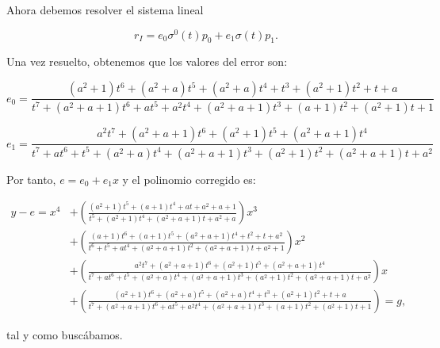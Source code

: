 \begin{ejemplo}
Ahora debemos resolver el sistema lineal 

$$r_I = e_0\sigma^0(t)p_0 + e_1\sigma(t)p_1.$$ 

Una vez resuelto, obtenemos que los valores del error son:

\begin{equation}
    e_0 = \frac{(a^2 + 1)t^6 + (a^2 + a)t^5 + (a^2 + a)t^4 + t^3 + (a^2 + 1)t^2 + t + a}{t^7 + (a^2 + a + 1)t^6 + a t^5 + a^2 t^4 + (a^2 + a + 1)t^3 + (a + 1)t^2 + (a^2 + 1)t + 1}
    \end{equation}
    
    \begin{equation}
    e_1 = \frac{a^2 t^7 + (a^2 + a + 1)t^6 + (a^2 + 1)t^5 + (a^2 + a + 1)t^4}{t^7 + a t^6 + t^5 + (a^2 + a)t^4 + (a^2 + a + 1)t^3 + (a^2 + 1)t^2 + (a^2 + a + 1)t + a^2}
    \end{equation}

Por tanto, $e = e_0 + e_1x$ y el polinomio corregido es:

\begin{equation}
    \begin{aligned}
    y - e = x^4 &+ \left( \frac{(a^2 + 1)t^5 + (a + 1)t^4 + a t + a^2 + a + 1}{t^5 + (a^2 + 1)t^4 + (a^2 + a + 1)t + a^2 + a} \right) x^3 \\
    &+ \left( \frac{(a + 1)t^6 + (a + 1)t^5 + (a^2 + a + 1)t^4 + t^2 + t + a^2}{t^6 + t^5 + a t^4 + (a^2 + a + 1)t^2 + (a^2 + a + 1)t + a^2 + 1} \right) x^2 \\
    &+ \left( \frac{a^2 t^7 + (a^2 + a + 1)t^6 + (a^2 + 1)t^5 + (a^2 + a + 1)t^4}{t^7 + a t^6 + t^5 + (a^2 + a)t^4 + (a^2 + a + 1)t^3 + (a^2 + 1)t^2 + (a^2 + a + 1)t + a^2} \right) x \\
    &+ \left( \frac{(a^2 + 1)t^6 + (a^2 + a)t^5 + (a^2 + a)t^4 + t^3 + (a^2 + 1)t^2 + t + a}{t^7 + (a^2 + a + 1)t^6 + a t^5 + a^2 t^4 + (a^2 + a + 1)t^3 + (a + 1)t^2 + (a^2 + 1)t + 1} \right) = g,
\end{aligned}
\end{equation}

tal y como buscábamos.



    


    
    


    
    
    
    
\end{ejemplo}




\endinput
